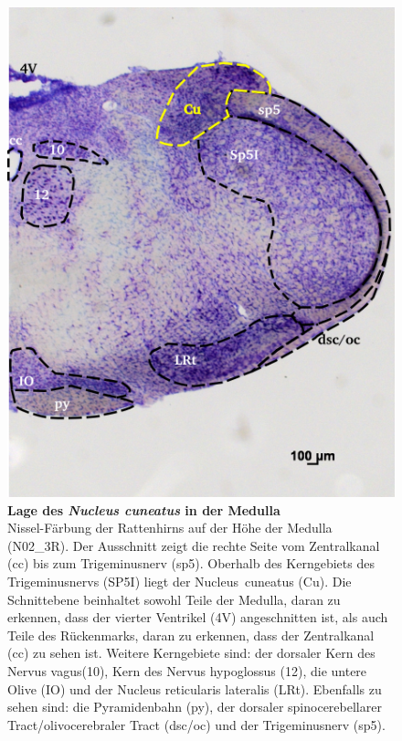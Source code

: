 \documentclass[12pt,a4paper,pdftex]{article}
\begin{document}
\begin{figure}[H]
    \centering
    \includegraphics{pictures/somatosensory/nucleus_cuneatus.png}
    \caption[Lage des \textit{Nucleus cuneatus} in der Medulla]{\textbf{Lage des \textit{Nucleus cuneatus} in der Medulla}\\
    Nissel-Färbung der Rattenhirns auf der Höhe der Medulla (N02\_3R). Der Ausschnitt zeigt die rechte Seite vom Zentralkanal (cc) bis zum Trigeminusnerv (sp5). Oberhalb des Kerngebiets des Trigeminusnervs (SP5I) liegt der Nucleus~cuneatus (Cu). Die Schnittebene beinhaltet sowohl Teile der Medulla, daran zu erkennen, dass der vierter Ventrikel (4V) angeschnitten ist, als auch Teile des Rückenmarks, daran zu erkennen, dass der Zentralkanal (cc) zu sehen ist. Weitere Kerngebiete sind: der dorsaler Kern des Nervus vagus(10), Kern des Nervus hypoglossus (12), die untere Olive (IO) und der Nucleus reticularis lateralis (LRt). Ebenfalls zu sehen sind: die Pyramidenbahn (py), der dorsaler spinocerebellarer Tract/olivocerebraler Tract (dsc/oc) und der Trigeminusnerv (sp5).}
    \label{fig:nucleus_cuneatus}
\end{figure}
\end{document}
